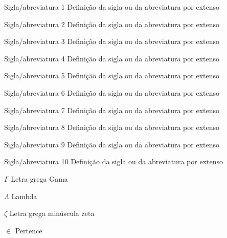 \documentclass[
	12pt,				%
	oneside,			%
	a4paper,			%
	english,			%
	brazil				%
	]{abntex2ppgsi}
\begin{document}
\listofalgorithms
\cleardoublepage

\listofquadros*
\cleardoublepage


\listoftables*
\cleardoublepage

%
%
\begin{siglas}
  \item[Sigla/abreviatura 1] Definição da sigla ou da abreviatura por extenso
  \item[Sigla/abreviatura 2] Definição da sigla ou da abreviatura por extenso
  \item[Sigla/abreviatura 3] Definição da sigla ou da abreviatura por extenso
  \item[Sigla/abreviatura 4] Definição da sigla ou da abreviatura por extenso
  \item[Sigla/abreviatura 5] Definição da sigla ou da abreviatura por extenso
  \item[Sigla/abreviatura 6] Definição da sigla ou da abreviatura por extenso
  \item[Sigla/abreviatura 7] Definição da sigla ou da abreviatura por extenso
  \item[Sigla/abreviatura 8] Definição da sigla ou da abreviatura por extenso
  \item[Sigla/abreviatura 9] Definição da sigla ou da abreviatura por extenso
  \item[Sigla/abreviatura 10] Definição da sigla ou da abreviatura por extenso
\end{siglas}

%
% 
\begin{simbolos}
  \item[$ \Gamma $] Letra grega Gama
  \item[$ \Lambda $] Lambda
  \item[$ \zeta $] Letra grega minúscula zeta
  \item[$ \in $] Pertence
\end{simbolos}
\end{document}
